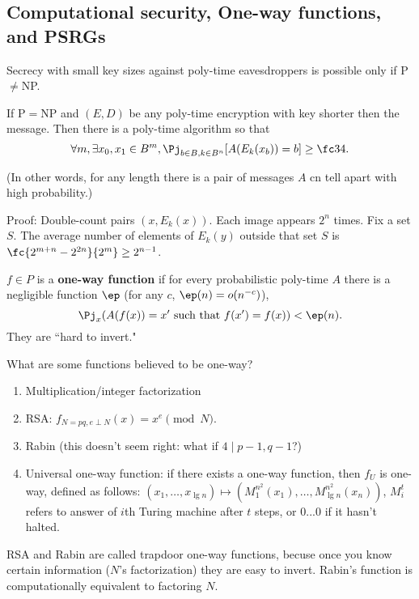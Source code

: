 \subsection{Computational security, One-way functions, and PSRGs}
Secrecy with small key sizes against poly-time eavesdroppers is possible only if P$\ne$NP.

\begin{lem}
If P$=$NP and $(E,D)$ be any poly-time encryption with key shorter then the message. Then there is a poly-time algorithm so that 
\[
\forall m, \exists x_0,x_1\in B^m, \Pj_{b\in B,k\in B^n} [A(E_k(x_b))=b]\ge \fc 34.
\]
\end{lem}
(In other words, for any length there is a pair of messages $A$ cn tell apart with high probability.)

Proof: Double-count pairs $(x,E_k(x))$. Each image appears $2^n$ times. Fix a set $S$. The average number of elements of $E_k(y)$ outside that set $S$ is $\fc{2^{m+n}-2^{2n}}{2^m}\ge 2^{n-1}$.

\begin{df}
$f\in P$ is a \textbf{one-way function} if for every probabilistic poly-time $A$ there is a negligible function $\ep$ (for any $c$, $\ep(n)=o(n^{-c})$),
\[
\Pj_{x}(A(f(x))=x'\text{ such that }f(x')=f(x))<\ep(n).
\]
They are ``hard to invert."
\end{df}
What are some functions believed to be one-way?
\begin{enumerate}
\item
Multiplication/integer factorization
\item
RSA: $f_{N=pq,e\perp N}(x)=x^e\pmod N$.
\item
Rabin (this doesn't seem right: what if $4\mid p-1,q-1$?)
\item
Universal one-way function: if there exists a one-way function, then $f_U$ is one-way, defined as follows: $(x_1,\ldots, x_{\lg n})\mapsto  (M_1^{n^2}(x_1),\ldots,M_{\lg n}^{n^2}(x_n))$, $M_i^t$ refers to answer of $i$th Turing machine after $t$ steps, or $0...0$ if it hasn't halted.
\end{enumerate}
RSA and Rabin are called trapdoor one-way functions, becuse once you know certain information ($N$'s factorization) they are easy to invert. Rabin's function is computationally equivalent to factoring $N$.

